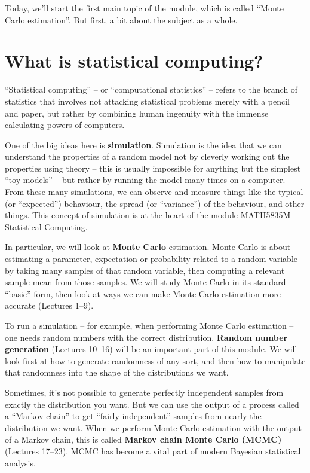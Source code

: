 \documentclass[
  letterpaper,
  DIV=11,
  numbers=noendperiod]{scrreprt}
\theoremstyle{plain}
\theoremstyle{definition}
\theoremstyle{definition}
\theoremstyle{remark}
\begin{document}
\[\newcommand{\Exg}{\operatorname{\mathbb{E}}} 
\newcommand{\Ex}{\mathbb{E}} 
\newcommand{\Ind}{\mathbb{I}}
\newcommand{\Var}{\operatorname{Var}}
\newcommand{\Cov}{\operatorname{Cov}}
\newcommand{\Corr}{\operatorname{Corr}}
\newcommand{\ee}{\mathrm{e}}\]

Today, we'll start the first main topic of the module, which is called
``Monte Carlo estimation''. But first, a bit about the subject as a
whole.

\section{What is statistical
computing?}\label{what-is-statistical-computing}

``Statistical computing'' -- or ``computational statistics'' -- refers
to the branch of statistics that involves not attacking statistical
problems merely with a pencil and paper, but rather by combining human
ingenuity with the immense calculating powers of computers.

One of the big ideas here is \textbf{simulation}. Simulation is the idea
that we can understand the properties of a random model not by cleverly
working out the properties using theory -- this is usually impossible
for anything but the simplest ``toy models'' -- but rather by running
the model many times on a computer. From these many simulations, we can
observe and measure things like the typical (or ``expected'') behaviour,
the spread (or ``variance'') of the behaviour, and other things. This
concept of simulation is at the heart of the module MATH5835M
Statistical Computing.

In particular, we will look at \textbf{Monte Carlo} estimation. Monte
Carlo is about estimating a parameter, expectation or probability
related to a random variable by taking many samples of that random
variable, then computing a relevant sample mean from those samples. We
will study Monte Carlo in its standard ``basic'' form, then look at ways
we can make Monte Carlo estimation more accurate (Lectures 1--9).

To run a simulation -- for example, when performing Monte Carlo
estimation -- one needs random numbers with the correct distribution.
\textbf{Random number generation} (Lectures 10--16) will be an important
part of this module. We will look first at how to generate randomness of
any sort, and then how to manipulate that randomness into the shape of
the distributions we want.

Sometimes, it's not possible to generate perfectly independent samples
from exactly the distribution you want. But we can use the output of a
process called a ``Markov chain'' to get ``fairly independent'' samples
from nearly the distribution we want. When we perform Monte Carlo
estimation with the output of a Markov chain, this is called
\textbf{Markov chain Monte Carlo (MCMC)} (Lectures 17--23). MCMC has
become a vital part of modern Bayesian statistical analysis.
\end{document}
